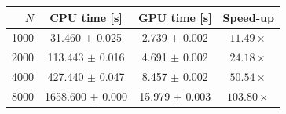 \begin{tabular}{rccc}\toprule
$N$ & CPU time [s] & GPU time [s] & Speed-up \\ \midrule
1000 & 31.460 $\pm$ 0.025 & 2.739 $\pm$ 0.002 & $11.49\times$ \\ 
2000 & 113.443 $\pm$ 0.016 & 4.691 $\pm$ 0.002 & $24.18\times$ \\ 
4000 & 427.440 $\pm$ 0.047 & 8.457 $\pm$ 0.002 & $50.54\times$ \\ 
8000 & 1658.600 $\pm$ 0.000 & 15.979 $\pm$ 0.003 & $103.80\times$ \\ 
\bottomrule\end{tabular}
